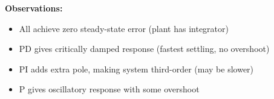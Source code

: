 \documentclass[11pt,a4paper]{article}
\begin{document}
\textbf{Observations:}
\begin{itemize}
  \item All achieve zero steady-state error (plant has integrator)
  \item PD gives critically damped response (fastest settling, no overshoot)
  \item PI adds extra pole, making system third-order (may be slower)
  \item P gives oscillatory response with some overshoot
\end{itemize}
\end{document}
